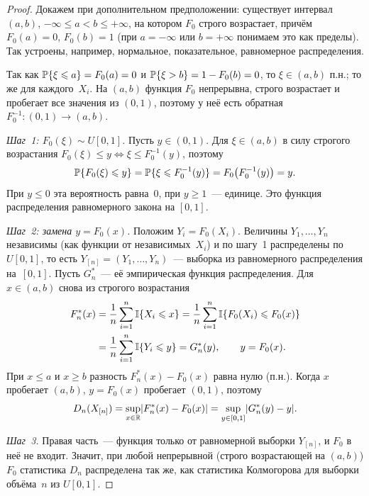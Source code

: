 \begin{proof}
  Докажем при дополнительном предположении: существует интервал $(a, b)$,
  $-\infty \le a < b \le +\infty$, на котором $F_0$ строго возрастает, причём
  $F_0(a) = 0$, $F_0(b) = 1$ (при $a = -\infty$ или $b = +\infty$ понимаем это как
  пределы). Так устроены, например, нормальное, показательное, равномерное распределения.

  Так как $\P\{\xi \le a\} = F_0(a) = 0$ и $\P\{\xi > b\} = 1 - F_0(b) = 0$, то
  $\xi \in (a, b)$ п.н.; то же для каждого~$X_i$. На $(a, b)$ функция $F_0$ непрерывна,
  строго возрастает и пробегает все значения из $(0, 1)$, поэтому у неё есть обратная
  $F_0^{-1} \colon (0, 1) \to (a, b)$.

  \emph{Шаг~1: $F_0(\xi) \sim U[0, 1]$.} Пусть $y \in (0, 1)$. Для $\xi \in (a, b)$
  в силу строгого возрастания $F_0(\xi) \le y \iff \xi \le F_0^{-1}(y)$, поэтому
  \[
    \P\{F_0(\xi) \le y\} = \P\{\xi \le F_0^{-1}(y)\} = F_0\bigl(F_0^{-1}(y)\bigr) = y.
  \]
  При $y \le 0$ эта вероятность равна~$0$, при $y \ge 1$~--- единице. Это функция
  распределения равномерного закона на $[0, 1]$.

  \emph{Шаг~2: замена $y = F_0(x)$.} Положим $Y_i = F_0(X_i)$. Величины
  $Y_1, \ldots, Y_n$ независимы (как функции от независимых~$X_i$) и по шагу~1
  распределены по $U[0, 1]$, то есть $Y_{[n]} = (Y_1, \ldots, Y_n)$~--- выборка
  из равномерного распределения на~$[0, 1]$. Пусть $G_n^*$~--- её эмпирическая функция
  распределения. Для $x \in (a, b)$ снова из строгого возрастания
  \begin{align*}
    F_n^*(x) &= \frac1n \sum_{i=1}^n \Ind{X_i \le x}
              = \frac1n \sum_{i=1}^n \Ind{F_0(X_i) \le F_0(x)} \\
             &= \frac1n \sum_{i=1}^n \Ind{Y_i \le y}
              = G_n^*(y), \qquad y = F_0(x).
  \end{align*}
  При $x \le a$ и $x \ge b$ разность $F_n^*(x) - F_0(x)$ равна нулю (п.н.). Когда $x$
  пробегает $(a, b)$, $y = F_0(x)$ пробегает $(0, 1)$, поэтому
  \[
    D_n(X_{[n]}) = \sup_{x \in \R} \abs{F_n^*(x) - F_0(x)}
                 = \sup_{y \in [0, 1]} \abs{G_n^*(y) - y}.
  \]

  \emph{Шаг~3.} Правая часть~--- функция только от равномерной выборки $Y_{[n]}$,
  и $F_0$ в неё не входит. Значит, при любой непрерывной (строго возрастающей на $(a, b)$)
  $F_0$ статистика $D_n$ распределена так же, как статистика Колмогорова для выборки
  объёма~$n$ из $U[0, 1]$.
\end{proof}

